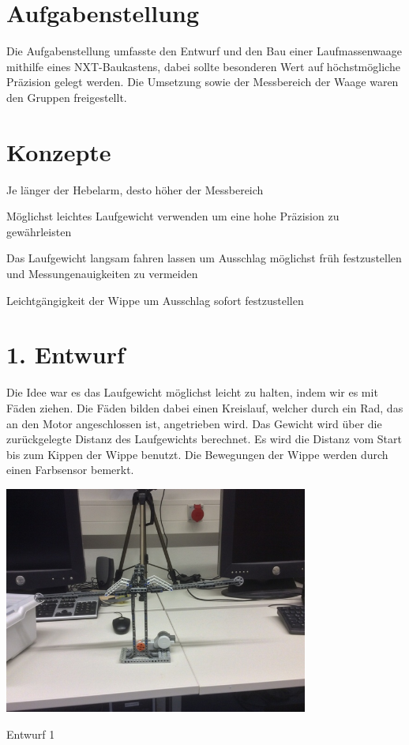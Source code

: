 \hypertarget{index_sec_1}{}\section{Aufgabenstellung}\label{index_sec_1}
Die Aufgabenstellung umfasste den Entwurf und den Bau einer Laufmassenwaage mithilfe eines N\-X\-T-\/\-Baukastens, dabei sollte besonderen Wert auf höchstmögliche Präzision gelegt werden. Die Umsetzung sowie der Messbereich der Waage waren den Gruppen freigestellt. \hypertarget{index_sec_2}{}\section{Konzepte}\label{index_sec_2}

\begin{DoxyItemize}
\item Je länger der Hebelarm, desto höher der Messbereich
\item Möglichst leichtes Laufgewicht verwenden um eine hohe Präzision zu gewährleisten
\item Das Laufgewicht langsam fahren lassen um Ausschlag möglichst früh festzustellen und Messungenauigkeiten zu vermeiden
\item Leichtgängigkeit der Wippe um Ausschlag sofort festzustellen 
\end{DoxyItemize}\hypertarget{index_sec_3}{}\section{1. Entwurf}\label{index_sec_3}
Die Idee war es das Laufgewicht möglichst leicht zu halten, indem wir es mit Fäden ziehen. Die Fäden bilden dabei einen Kreislauf, welcher durch ein Rad, das an den Motor angeschlossen ist, angetrieben wird. Das Gewicht wird über die zurückgelegte Distanz des Laufgewichts berechnet. Es wird die Distanz vom Start bis zum Kippen der Wippe benutzt. Die Bewegungen der Wippe werden durch einen Farbsensor bemerkt.

 
\begin{DoxyImage}
\includegraphics[width=10cm]{entwurf1.jpg}
\caption{Entwurf 1}
\end{DoxyImage}


